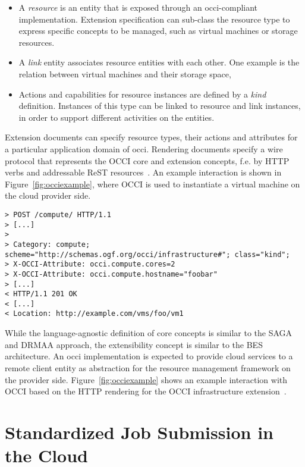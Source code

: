 \documentclass[twocolumn]{svjour3}       %
\begin{document}
\begin{itemize}
\item A \emph{resource} is an entity that is exposed through an \gls{occi}-compliant implementation. Extension specification can sub-class the resource type to express specific concepts to be managed, such as virtual machines or storage resources.
\item A \emph{link} entity associates resource entities with each other. One example is the relation between virtual machines and their storage space,
\item Actions and capabilities for resource instances are defined by a \emph{kind} definition. Instances of this type can be linked to resource and link instances, in order to support different activities on the entities.
\end{itemize}

Extension documents can specify resource types, their actions and attributes for a particular application domain of \gls{occi}. Rendering documents specify a wire protocol that represents the OCCI core and extension concepts, f.e. by HTTP verbs and addressable ReST resources~\cite{gfd185}. An example interaction is shown in Figure~\ref{fig:occiexample}, where OCCI is used to instantiate a virtual machine on the cloud provider side.

\begin{figure*}
\begin{lstlisting}
> POST /compute/ HTTP/1.1 
> [...] 
> 
> Category: compute; scheme="http://schemas.ogf.org/occi/infrastructure#"; class="kind"; 
> X-OCCI-Attribute: occi.compute.cores=2
> X-OCCI-Attribute: occi.compute.hostname="foobar" 
> [...]
< HTTP/1.1 201 OK 
< [...] 
< Location: http://example.com/vms/foo/vm1
\end{lstlisting}
\caption{Example: Creating a virtual machine instance}
\label{fig:occiexample} 
\end{figure*}


While the language-agnostic definition of core concepts is similar to the SAGA and DRMAA approach, the extensibility concept is similar to the BES architecture. An \gls{occi} implementation is expected to provide cloud services to a remote client entity as abstraction for the resource management framework on the provider side. Figure~\ref{fig:occiexample} shows an example interaction with OCCI based on the HTTP rendering for the OCCI infrastructure extension~\cite{citemaster_9271}.

\section{Standardized Job Submission in the Cloud}
\end{document}
